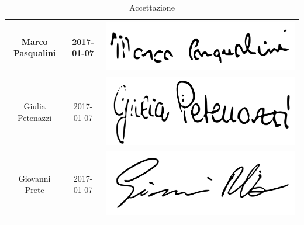 \begin{table}[H]
\begin{center}
\begin{tabular}{ccc}
			\midrule
			Marco Pasqualini	&	2017-01-07	& \includegraphics[scale=0.10]{./img/Firme/marco.png} \\
			\midrule
			Giulia Petenazzi	&	2017-01-07	& \includegraphics[scale=0.10]{./img/Firme/giulia.png} \\
			\midrule
			Giovanni Prete	&	2017-01-07	& \includegraphics[scale=0.10]{./img/Firme/giovannip.png} \\
			\bottomrule
		\end{tabular}
	\end{center}
	\caption{Accettazione}
\end{table}

